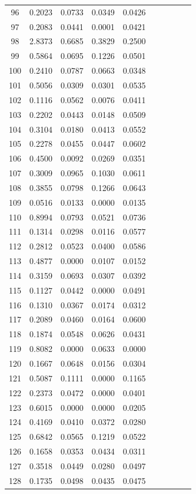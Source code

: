 \begin{table}
\begin{tabular}{cccccccccc}
96& 0.2023& 0.0733& 0.0349& 0.0426\\ 
97& 0.2083& 0.0441& 0.0001& 0.0421\\ 
98& 2.8373& 0.6685& 0.3829& 0.2500\\ 
99& 0.5864& 0.0695& 0.1226& 0.0501\\ 
100& 0.2410& 0.0787& 0.0663& 0.0348\\ 
101& 0.5056& 0.0309& 0.0301& 0.0535\\ 
102& 0.1116& 0.0562& 0.0076& 0.0411\\ 
103& 0.2202& 0.0443& 0.0148& 0.0509\\ 
104& 0.3104& 0.0180& 0.0413& 0.0552\\ 
105& 0.2278& 0.0455& 0.0447& 0.0602\\ 
106& 0.4500& 0.0092& 0.0269& 0.0351\\ 
107& 0.3009& 0.0965& 0.1030& 0.0611\\ 
108& 0.3855& 0.0798& 0.1266& 0.0643\\ 
109& 0.0516& 0.0133& 0.0000& 0.0135\\ 
110& 0.8994& 0.0793& 0.0521& 0.0736\\ 
111& 0.1314& 0.0298& 0.0116& 0.0577\\ 
112& 0.2812& 0.0523& 0.0400& 0.0586\\ 
113& 0.4877& 0.0000& 0.0107& 0.0152\\ 
114& 0.3159& 0.0693& 0.0307& 0.0392\\ 
115& 0.1127& 0.0442& 0.0000& 0.0491\\ 
116& 0.1310& 0.0367& 0.0174& 0.0312\\ 
117& 0.2089& 0.0460& 0.0164& 0.0600\\ 
118& 0.1874& 0.0548& 0.0626& 0.0431\\ 
119& 0.8082& 0.0000& 0.0633& 0.0000\\ 
120& 0.1667& 0.0648& 0.0156& 0.0304\\ 
121& 0.5087& 0.1111& 0.0000& 0.1165\\ 
122& 0.2373& 0.0472& 0.0000& 0.0401\\ 
123& 0.6015& 0.0000& 0.0000& 0.0205\\ 
124& 0.4169& 0.0410& 0.0372& 0.0280\\ 
125& 0.6842& 0.0565& 0.1219& 0.0522\\ 
126& 0.1658& 0.0353& 0.0434& 0.0311\\ 
127& 0.3518& 0.0449& 0.0280& 0.0497\\ 
128& 0.1735& 0.0498& 0.0435& 0.0475\\ 

\end{tabular}
\end{table}
